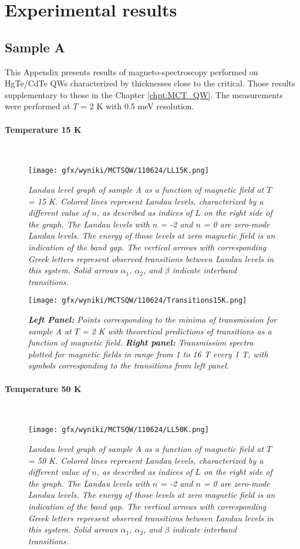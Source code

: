 \documentclass[titlepage,a4paper]{book}
\newcommand{\wciecie}{\quad\phantom{v}}
\newcommand{\myparagraph}[1]{\paragraph{#1}\mbox{}\\}
\begin{document}
\clearpage
\section{Experimental results}
\subsection{Sample A}
\wciecie
This Appendix presents results of magneto-spectroscopy performed on HgTe/CdTe QWs characterized by thicknesses close to the critical. Those results supplementary to those in the Chapter \ref{chpt:MCT_QW}. The measurements were performed at $T$ = 2 K with 0.5 meV resolution. 

\myparagraph{Temperature 15 K}
\wciecie
\begin{figure}[H]
	\centering
	\texttt{[image: gfx/wyniki/MCTSQW/110624/LL15K.png]}
	\vspace{-10pt}
	\caption{\textit{Landau level graph of sample A as a function of magnetic field at $T$ = 15 K. Colored lines represent Landau levels, characterized by a different value of $n$, as described as indices of $L$ on the right side of the graph. The Landau levels with $n$ = -2 and $n$ = 0 are zero-mode Landau levels. The energy of those levels at zero magnetic field is an indication of the band gap. The vertical arrows with corresponding Greek letters represent observed transitions between Landau levels in this system. Solid arrows $\alpha_1$, $\alpha_2$, and $\beta$ indicate interband transitions.}}
	\label{fig:LL_110624_15K}
\end{figure}

\begin{figure}[H]
	\centering
	\texttt{[image: gfx/wyniki/MCTSQW/110624/Transitions15K.png]}
	\vspace{-10pt}
	\caption{\textit{\textbf{Left Panel:} Points corresponding to the minima of transmission for sample A at $T$ = 2 K with theoretical predictions of transitions as a function of magnetic field. \textbf{Right panel:} Transmission spectra plotted for magnetic fields in range from 1 to 16 T every 1 T, with symbols corresponding to the transitions from left panel.}}
	\label{fig:Transitions_110624_15K}
\end{figure}


\myparagraph{Temperature 50 K}
\wciecie
\begin{figure}[H]
	\centering
	\texttt{[image: gfx/wyniki/MCTSQW/110624/LL50K.png]}
	\vspace{-10pt}
	\caption{\textit{Landau level graph of sample A as a function of magnetic field at $T$ = 50 K. Colored lines represent Landau levels, characterized by a different value of $n$, as described as indices of $L$ on the right side of the graph. The Landau levels with $n$ = -2 and $n$ = 0 are zero-mode Landau levels. The energy of those levels at zero magnetic field is an indication of the band gap. The vertical arrows with corresponding Greek letters represent observed transitions between Landau levels in this system. Solid arrows $\alpha_1$, $\alpha_2$, and $\beta$ indicate interband transitions.}}
	\label{fig:LL_110624_50K}
\end{figure}
\end{document}
